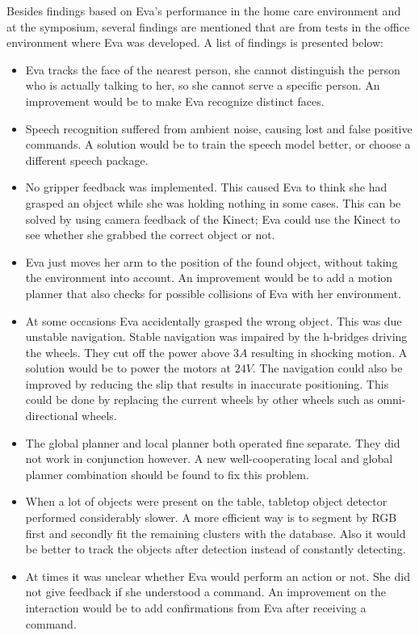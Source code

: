 \documentclass[project_eva.tex]{subfiles}
\begin{document}
Besides findings based on Eva's performance in the home care environment and at the symposium, several findings are mentioned that are from tests in the office environment where Eva was developed. A list of findings is presented below:

\begin{itemize}
\item Eva tracks the face of the nearest person, she cannot distinguish the person who is actually talking to her, so she cannot serve a specific person. An improvement would be to make Eva recognize distinct faces.

\item Speech recognition suffered from ambient noise, causing lost and false positive commands. A solution would be to train the speech model better, or choose a different speech package. 
\item No gripper feedback was implemented. This caused Eva to think she had grasped an object while she was holding nothing in some cases. This can be solved by using camera feedback of the Kinect; Eva could use the Kinect to see whether she grabbed the correct object or not.
\item Eva just moves her arm to the position of the found object, without taking the environment into account. An improvement would be to add a motion planner that also checks for possible collisions of Eva with her environment.
\item  At some occasions Eva accidentally grasped the wrong object. This was due unstable navigation. Stable navigation was impaired by the h-bridges driving the wheels. They cut off the power above $3A$ resulting in shocking motion. A solution would be to power the motors at $24V$. The navigation could also be improved by reducing the slip  that results in inaccurate positioning. This could be done by replacing the current wheels by other wheels such as omni-directional wheels.
\item The global planner and local planner both operated fine separate. They did not work in conjunction however. A new well-cooperating local and global planner combination should be found to fix this problem.  
\item When a lot of objects were present on the table, tabletop object detector performed considerably slower. A more efficient way is to segment by RGB first and secondly fit the remaining clusters with the database. Also it would be better to track the objects after detection instead of constantly detecting.
\item At times it was unclear whether Eva would perform an action or not. She did not give feedback if she understood a command. An improvement on the interaction would be to add confirmations from Eva after receiving a command.

\end{itemize}
\end{document}
